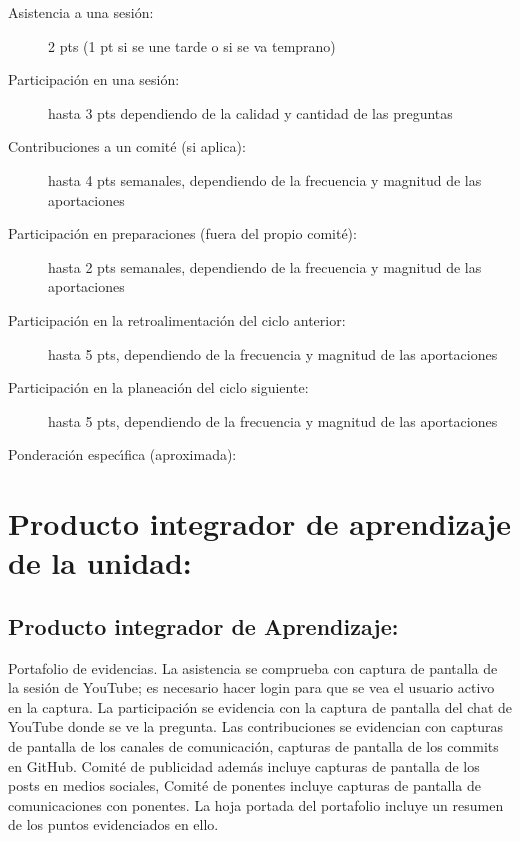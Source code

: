 \documentclass[10 pt]{article}
\begin{document}
  \begin{description}
  \item[Asistencia a una sesi\'{o}n:]{2 pts (1 pt si se une tarde o si se
      va temprano)}
  \item[Participaci\'{o}n en una sesi\'{o}n:]{hasta 3 pts dependiendo de la
      calidad y cantidad de las preguntas}
  \item[Contribuciones a un comit\'{e} (si aplica):]{hasta 4 pts
      semanales, dependiendo de la frecuencia y magnitud de las
      aportaciones}
  \item[Participaci\'{o}n en preparaciones (fuera del propio
    comit\'{e}):]{hasta 2 pts semanales, dependiendo de la frecuencia y
      magnitud de las aportaciones}
  \item[Participaci\'{o}n en la retroalimentaci\'{o}n del ciclo
    anterior:]{hasta 5 pts, dependiendo de la frecuencia y magnitud de
      las aportaciones}
  \item[Participaci\'{o}n en la planeaci\'{o}n del ciclo siguiente:]{hasta 5
      pts, dependiendo de la frecuencia y magnitud de las
      aportaciones}
  \end{description}

  
  Ponderaci\'{o}n espec\'{\i}fica (aproximada):


  
  \newpage

\section{Producto integrador de aprendizaje de la unidad:}
\subsection{Producto integrador de Aprendizaje:} Portafolio de
evidencias.
  La asistencia se comprueba con captura de pantalla de la sesi\'{o}n de
  YouTube; es necesario hacer login para que se vea el usuario activo
  en la captura. La participaci\'{o}n se evidencia con la captura de
  pantalla del chat de YouTube donde se ve la pregunta. Las
  contribuciones se evidencian con capturas de pantalla de los canales
  de comunicaci\'{o}n, capturas de pantalla de los commits en
  GitHub. Comit\'{e} de publicidad adem\'{a}s incluye capturas de pantalla de
  los posts en medios sociales, Comit\'{e} de ponentes incluye capturas de
  pantalla de comunicaciones con ponentes. La hoja portada del
  portafolio incluye un resumen de los puntos evidenciados en ello.
\end{document}
